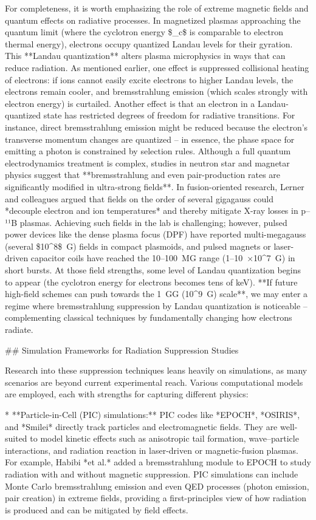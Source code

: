 \documentclass[12pt]{article}
\begin{document}
{For completeness, it is worth emphasizing the role of extreme magnetic fields and quantum effects on radiative processes. In magnetized plasmas approaching the quantum limit (where the cyclotron energy \$\hbar \omega\_c\$ is comparable to electron thermal energy), electrons occupy quantized Landau levels for their gyration. This **Landau quantization** alters plasma microphysics in ways that can reduce radiation. As mentioned earlier, one effect is suppressed collisional heating of electrons: if ions cannot easily excite electrons to higher Landau levels, the electrons remain cooler, and bremsstrahlung emission (which scales strongly with electron energy) is curtailed. Another effect is that an electron in a Landau-quantized state has restricted degrees of freedom for radiative transitions. For instance, direct bremsstrahlung emission might be reduced because the electron’s transverse momentum changes are quantized – in essence, the phase space for emitting a photon is constrained by selection rules. Although a full quantum electrodynamics treatment is complex, studies in neutron star and magnetar physics suggest that **bremsstrahlung and even pair-production rates are significantly modified in ultra-strong fields**. In fusion-oriented research, Lerner and colleagues argued that fields on the order of several gigagauss could *decouple electron and ion temperatures* and thereby mitigate X-ray losses in p–¹¹B plasmas. Achieving such fields in the lab is challenging; however, pulsed power devices like the dense plasma focus (DPF) have reported multi-megagauss (several \$10^8\$ G) fields in compact plasmoids, and pulsed magnets or laser-driven capacitor coils have reached the 10–100 MG range (1–10 ×10^7 G) in short bursts. At those field strengths, some level of Landau quantization begins to appear (the cyclotron energy for electrons becomes tens of keV). **If future high-field schemes can push towards the 1 GG (10^9 G) scale**, we may enter a regime where bremsstrahlung suppression by Landau quantization is noticeable – complementing classical techniques by fundamentally changing how electrons radiate.

## Simulation Frameworks for Radiation Suppression Studies

Research into these suppression techniques leans heavily on simulations, as many scenarios are beyond current experimental reach. Various computational models are employed, each with strengths for capturing different physics:

* **Particle-in-Cell (PIC) simulations:** PIC codes like *EPOCH*, *OSIRIS*, and *Smilei* directly track particles and electromagnetic fields. They are well-suited to model kinetic effects such as anisotropic tail formation, wave–particle interactions, and radiation reaction in laser-driven or magnetic-fusion plasmas. For example, Habibi *et al.* added a bremsstrahlung module to EPOCH to study radiation with and without magnetic suppression. PIC simulations can include Monte Carlo bremsstrahlung emission and even QED processes (photon emission, pair creation) in extreme fields, providing a first-principles view of how radiation is produced and can be mitigated by field effects.

}
\end{document}

